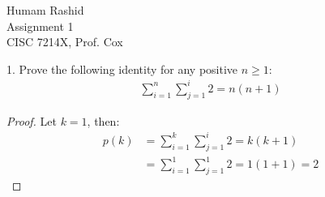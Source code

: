\documentclass{scrartcl}
\begin{document}
\begin{flushleft}

    Humam Rashid\\
    Assignment 1\\
    CISC 7214X, Prof. Cox\\
    \bigskip
    
    1. Prove the following identity for any positive $n \geq 1$:
    \begin{align*}
        \sum_{i=1}^{n}\sum_{j=1}^{i} 2 = n (n + 1)
    \end{align*}

    \begin{proof}
        Let $k = 1$, then:
        \begin{align*}
            p(k) &= \sum_{i=1}^{k}\sum_{j=1}^{i} 2 = k (k + 1) \\
            &= \sum_{i=1}^{1}\sum_{j=1}^{1} 2 = 1 (1 + 1) = 2
        \end{align*}
    \end{proof}

\end{flushleft}
\end{document}
